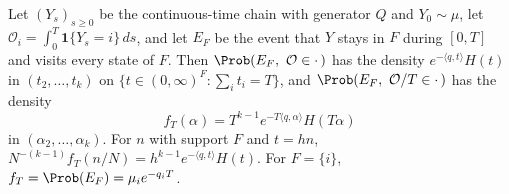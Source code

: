 \begin{lemma}\label{lem:continuum}
Let $(Y_s)_{s\ge0}$ be the continuous-time chain with generator $Q$ and
$Y_0\sim\mu$, let $\mathcal O_i=\int_0^T\mathbf 1\{Y_s=i\}\,ds$, and let $E_F$
be the event that $Y$ stays in $F$ during $[0,T]$ and visits every state of $F$.
Then $\Prob(E_F,\ \mathcal O\in\cdot\,)$ has the density
$e^{-\langle q,t\rangle}H(t)$ in $(t_2,\dots,t_k)$ on
$\{t\in(0,\infty)^F:\sum_it_i=T\}$, and $\Prob(E_F,\ \mathcal O/T\in\cdot\,)$
has the density
\[
f_T(\alpha)=T^{k-1}e^{-T\langle q,\alpha\rangle}H(T\alpha)
\]
in $(\alpha_2,\dots,\alpha_k)$. For $n$ with support $F$ and $t=hn$,
$N^{-(k-1)}f_T(n/N)=h^{k-1}e^{-\langle q,t\rangle}H(t)$. For $F=\{i\}$,
$f_T=\Prob(E_F)=\mu_ie^{-q_iT}$.
\end{lemma}

